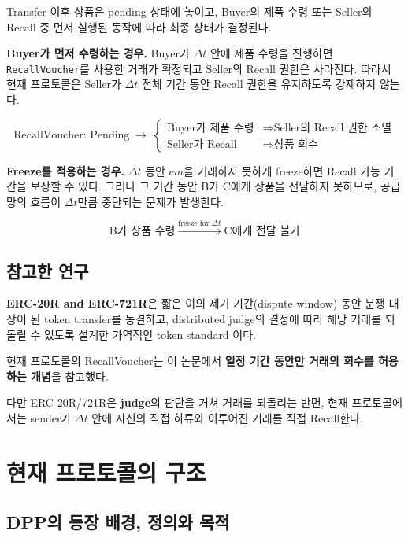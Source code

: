 \documentclass[11pt,a4paper]{extarticle}
\begin{document}
Transfer
이후 상품은 pending 상태에 놓이고, Buyer의 제품 수령 또는 Seller의 Recall 중 먼저
실행된 동작에 따라 최종 상태가 결정된다.

\textbf{Buyer가 먼저 수령하는 경우.}
Buyer가 \(\Delta t\) 안에 제품 수령을 진행하면
\texttt{RecallVoucher}를 사용한 거래가 확정되고 Seller의 Recall 권한은 사라진다.
따라서 현재 프로토콜은 Seller가 \(\Delta t\) 전체 기간 동안 Recall 권한을
유지하도록 강제하지 않는다.

\[
  \boxed{\text{RecallVoucher: Pending}}
  \;\longrightarrow\;
  \begin{cases}
    \text{Buyer가 제품 수령}   & \Rightarrow \text{Seller의 Recall 권한 소멸} \\
    \text{Seller가 Recall} & \Rightarrow \text{상품 회수}
  \end{cases}
\]

\textbf{Freeze를 적용하는 경우.}
\(\Delta t\) 동안 \(cm\)을 거래하지 못하게 freeze하면 Recall 가능 기간을 보장할
수 있다. 그러나 그 기간 동안 B가 C에게 상품을 전달하지 못하므로, 공급망의 흐름이
\(\Delta t\)만큼 중단되는 문제가 발생한다.

\[
  \boxed{\text{B가 상품 수령}}
  \;\xrightarrow{\text{freeze for }\Delta t}\;
  \boxed{\text{C에게 전달 불가}}
\]

\subsection{참고한 연구}

\textbf{ERC-20R and ERC-721R}은 짧은 이의 제기 기간(dispute window) 동안
분쟁 대상이 된 token transfer를 동결하고, distributed judge의 결정에 따라 해당 거래를 되돌릴 수 있도록 설계한
가역적인 token standard 이다.

현재 프로토콜의 RecallVoucher는 이 논문에서 \textbf{일정 기간 동안만 거래의 회수를 허용하는 개념}을 참고했다.

다만 ERC-20R/721R은 \textbf{judge}의 판단을 거쳐 거래를 되돌리는 반면, 현재 프로토콜에서는
sender가 \(\Delta t\) 안에 자신의 직접 하류와 이루어진 거래를 직접 Recall한다.


\section{현재 프로토콜의 구조}

\subsection{DPP의 등장 배경, 정의와 목적}
\end{document}
